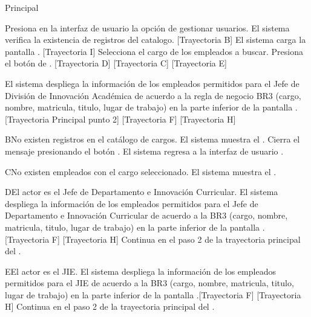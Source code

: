 \begin{UCtrayectoria}{Principal}
    
    \UCpaso[\UCactor] Presiona en la interfaz de usuario  la opción de gestionar usuarios. 
    \UCpaso  El sistema verifica la existencia de registros del catalogo. [Trayectoria B] 
    \UCpaso El sistema carga la pantalla  . [Trayectoria I] 
    \UCpaso[\UCactor] Selecciona el cargo de los empleados a buscar. 
    \UCpaso[\UCactor]  Presiona el botón de . [Trayectoria D] [Trayectoria C] [Trayectoria E]
    
    \UCpaso El sistema despliega la información de los empleados permitidos para el Jefe de División de Innovación Académica de acuerdo a la regla de negocio BR3 (cargo, nombre, matricula, titulo, lugar de trabajo) en la parte inferior de la pantalla . [Trayectoria Principal punto 2] [Trayectoria F] [Trayectoria H] 
\end{UCtrayectoria}

\begin{UCtrayectoriaA}{B}{No existen registros en el catálogo de cargos.}
    \UCpaso     El sistema muestra el .
    \UCpaso[\UCactor] Cierra el mensaje presionando el botón .
    \UCpaso El sistema regresa a la interfaz de usuario .
\end{UCtrayectoriaA}

\begin{UCtrayectoriaA}{C}{No existen  empleados con el cargo seleccionado.}
    \UCpaso     El sistema muestra el .
\end{UCtrayectoriaA}

\begin{UCtrayectoriaA}{D}{El actor es el Jefe de Departamento e Innovación Curricular.}
 \UCpaso El sistema despliega la información  de los empleados permitidos para el Jefe de Departamento e Innovación Curricular de acuerdo a la BR3 (cargo, nombre, matricula, titulo, lugar de trabajo) en la parte inferior de la pantalla . [Trayectoria F] [Trayectoria H] 
  \UCpaso Continua en el paso 2 de la trayectoria principal del .
\end{UCtrayectoriaA}

\begin{UCtrayectoriaA}{E}{El actor es el JIE.}
 \UCpaso El sistema despliega la información  de los empleados permitidos para el JIE de acuerdo a la BR3 (cargo, nombre, matricula, titulo, lugar de trabajo) en la parte inferior de la pantalla .[Trayectoria F] [Trayectoria H] 
 \UCpaso Continua en el paso 2 de la trayectoria principal del .
\end{UCtrayectoriaA}

